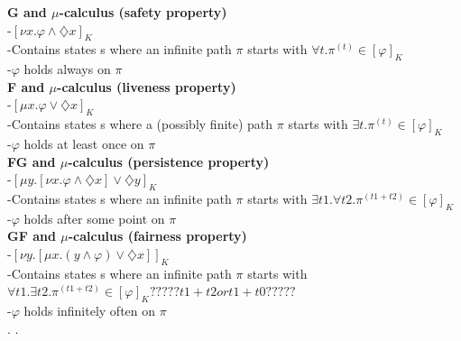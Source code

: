 \documentclass{article}
\begin{document}
\begin{multicols}{4}
\textbf{G and $\mu$-calculus (safety property)} \\
-$[\nu x. \varphi \wedge \diamondsuit x]_{K} $ \\
-Contains states s where an infinite path $\pi$ starts with $\forall t. \pi^{(t)} \in [\varphi]_{K}$ \\
-$\varphi$ holds always on $\pi$ \\
\textbf{F and $\mu$-calculus (liveness property)} \\
-$[\mu x. \varphi \vee \diamondsuit x]_{K} $ \\
-Contains states s where a (possibly finite) path $\pi$ starts with $\exists t. \pi^{(t)} \in [\varphi]_{K}$ \\
-$\varphi$ holds at least once on $\pi$ \\
\textbf{FG and $\mu$-calculus (persistence property)} \\
-$[\mu y.[\nu x. \varphi \wedge \diamondsuit x] \vee \diamondsuit y]_{K} $ \\
-Contains states s where an infinite path $\pi$ starts with $\exists t1.\forall t2. \pi^{(t1+t2)} \in [\varphi]_{K}$ \\
-$\varphi$ holds after some point on $\pi$ \\
\textbf{GF and $\mu$-calculus (fairness property)} \\
-$[\nu y.[\mu x. (y \wedge \varphi) \vee \diamondsuit x]]_{K} $ \\
-Contains states s where an infinite path $\pi$ starts with $\forall t1.\exists t2. \pi^{(t1+t2)} \in [\varphi]_{K} ?????t1+t2 or t1+t0?????$ \\
-$\varphi$ holds infinitely often on $\pi$ \\
\vfill
\columnbreak
.
\vfill
\columnbreak
.
%
%

\end{multicols}
\end{document}
